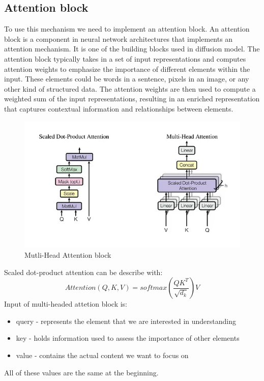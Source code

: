 \documentclass[11pt,a4paper]{report}
\begin{document}
\subsection{Attention block}
To use this mechanism we need to implement  an attention block. An attention block is a component in neural network architectures that implements an attention mechanism. It is one of the building blocks used in diffusion model. The attention block typically takes in a set of input representations and computes attention weights to emphasize the importance of different elements within the input. These elements could be words in a sentence, pixels in an image, or any other kind of structured data. The attention weights are then used to compute a weighted sum of the input representations, resulting in an enriched representation that captures contextual information and relationships between elements.

\begin{figure}[H]
	\centering
	\includegraphics[width=\textwidth]{images/multi_headed}
    \caption{Mutli-Head Attention block \cite{AttentionIsAll}}
\end{figure}

Scaled dot-product attention can be describe with:
\[Attention(Q,K,V) = softmax(\frac{QK^T}{\sqrt{d_k}})V\]
Input of multi-headed attetion block is:
\begin{itemize}
\item query - represents the element that we are interested in understanding
\item key - holds information used to assess the importance of other elements
\item value - contains the actual content we want to focus on
\end{itemize}
All of these values are the same at the beginning.
\end{document}
